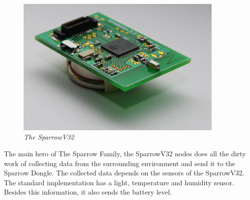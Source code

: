 \begin{figure}[ht]
\begin{center}
\includegraphics[width=0.9\textwidth]{hw_platform/Sparrowv32.jpg}
\end{center}
\caption{\small \itshape{The SparrowV32}}
\end{figure}


The main hero of The Sparrow Family, the SparrowV32 nodes does all the dirty work of collecting data from the surrounding environment and send it to the Sparrow Dongle. The collected data depends on the sensors of the SparrowV32. The standard implementation has a light, temperature and humidity sensor. Besides this information, it also sends the battery level.
